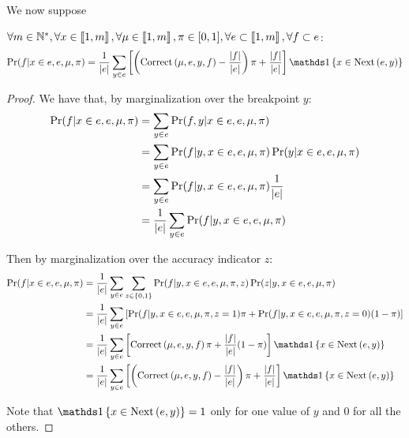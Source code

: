 We now suppose 
\begin{lemma}[$e_j$ transition]
    \label{lemma:bos_transition}
    $\forall m \in \mathbb{N}^*, \forall x \in \left\llbracket1, m\right\rrbracket, \forall \mu \in \left\llbracket1, m\right\rrbracket, \pi \in [0, 1], \forall e \subset \left\llbracket1, m\right\rrbracket, \forall f \subset e$:
    \[ \Pr(f | x \in e, e, \mu, \pi) =  \frac{1}{\card{e}}  \sum_{y \in e} \left[ \left( \correct{\mu}{e}{y}{f} - \frac{\card{f}}{\card{e}} \right) \pi + \frac{\card{f}}{\card{e}} \right]  \indickronecker{x \in \nextes{e}{y}} \]
\end{lemma}
\begin{proof}
    We have that, by marginalization over the breakpoint $y$:
    \begin{align}
        \Pr(f | x \in e, e, \mu, \pi) 
        &= \sum_{y \in e} \Pr(f, y | x \in e, e, \mu, \pi) \\
        &= \sum_{y \in e} \Pr(f | y, x \in e, e, \mu, \pi) \Pr(y | x \in e, e, \mu, \pi) \\
        &= \sum_{y \in e} \Pr(f | y, x \in e, e, \mu, \pi) \frac{1}{\left|e\right|} \\
        &= \frac{1}{\left|e\right|} \sum_{y \in e} \Pr(f | y, x \in e, e, \mu, \pi)
    \end{align}

    Then by marginalization over the accuracy indicator $z$:
    \begin{align}
        \Pr(f | x \in e, e, \mu, \pi) 
        &= \frac{1}{\card{e}} \sum_{y \in e} \sum_{z \in \set{0, 1}} \Pr(f | y, x \in e, e, \mu, \pi, z) \Pr(z | y, x \in e, e, \mu, \pi) \\
        &= \frac{1}{\card{e}} \sum_{y \in e} \left[ \Pr(f | y, x \in e, e, \mu, \pi, z=1) \pi + \Pr(f | y, x \in e, e, \mu, \pi, z=0) (1 - \pi) \right] \\
        &= \frac{1}{\card{e}}  \sum_{y \in e} \left[ \correct{\mu}{e}{y}{f} \pi + \frac{\card{f}}{\card{e}} (1 - \pi) \right]  \indickronecker{x \in \nextes{e}{y}} \\
        &= \frac{1}{\card{e}}  \sum_{y \in e} \left[ \left( \correct{\mu}{e}{y}{f} - \frac{\card{f}}{\card{e}} \right) \pi + \frac{\card{f}}{\card{e}} \right]  \indickronecker{x \in \nextes{e}{y}}
    \end{align}

    Note that $\indickronecker{x \in \nextes{e}{y}} = 1$ only for one value of $y$ and $0$ for all the others.
\end{proof}

